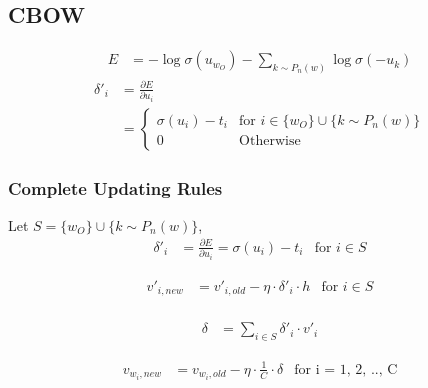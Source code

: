 \documentclass{article}
\begin{document}
	\subsection {CBOW} 
	\begin{equation}
		\begin{aligned}
			E &= -\log \sigma(u_{w_O}) - \sum_{k \sim P_n(w)} \log \sigma (-u_{k}) 
		\end{aligned}
	\end{equation}
	\begin{equation}
		\begin{aligned}
			\delta'_{i} &= \frac{\partial E}{\partial u_{i}} \\
			&= 
			\begin{cases}
				\sigma(u_{i}) - t_{i} &\mbox{for $i \in \{w_O\} \cup \{k \sim P_n(w) \}$}\\
				0  &\mbox{Otherwise}
			\end{cases}
		\end{aligned}
	\end{equation}
	
	\subsubsection*{Complete Updating Rules}

	\begin{framed}
	\centering
	Let $S = \{w_O\} \cup \{k \sim P_n(w) \}$,
	\begin{equation}
		\begin{aligned}
			\delta'_{i} &= \frac{\partial E}{\partial u_{i}} = \sigma(u_{i}) - t_{i} &\mbox{for $i \in S$}
		\end{aligned}
	\end{equation}
		
	\begin{equation}
		\begin{aligned}
			v'_{i, new} &= v'_{i, old} - \eta \cdot \delta'_i \cdot h  &\mbox{for $i \in S$}\\
		\end{aligned}
	\end{equation}
	
	\begin{equation}
		\begin{aligned}
		\delta &= \sum_{i \in S} \delta'_{i} \cdot v'_{i}
		\end{aligned}
	\end{equation}
	
	\begin{equation}
		\begin{aligned}
			v_{w_i, new} &= v_{w_i, old} - \eta \cdot \frac{1}{C} \cdot \delta &\mbox{for i = 1, 2, .., C}
		\end{aligned}
	\end{equation}
			
	\end{framed}
	
\end{document}
